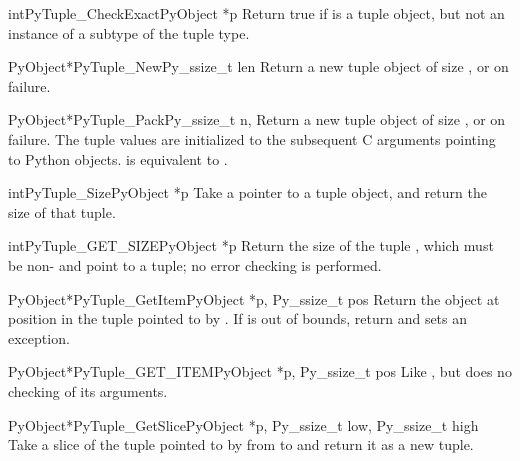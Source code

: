 \begin{cfuncdesc}{int}{PyTuple_CheckExact}{PyObject *p}
  Return true if  is a tuple object, but not an instance of a
  subtype of the tuple type.
\end{cfuncdesc}

\begin{cfuncdesc}{PyObject*}{PyTuple_New}{Py_ssize_t len}
  Return a new tuple object of size , or \NULL{} on failure.
\end{cfuncdesc}

\begin{cfuncdesc}{PyObject*}{PyTuple_Pack}{Py_ssize_t n, \moreargs}
  Return a new tuple object of size , or \NULL{} on failure.
  The tuple values are initialized to the subsequent  C arguments
  pointing to Python objects.  
  is equivalent to .
\end{cfuncdesc}

\begin{cfuncdesc}{int}{PyTuple_Size}{PyObject *p}
  Take a pointer to a tuple object, and return the size of that
  tuple.
\end{cfuncdesc}

\begin{cfuncdesc}{int}{PyTuple_GET_SIZE}{PyObject *p}
  Return the size of the tuple , which must be non-\NULL{} and
  point to a tuple; no error checking is performed.
\end{cfuncdesc}

\begin{cfuncdesc}{PyObject*}{PyTuple_GetItem}{PyObject *p, Py_ssize_t pos}
  Return the object at position  in the tuple pointed to by
  .  If  is out of bounds, return \NULL{} and sets an
   exception.
\end{cfuncdesc}

\begin{cfuncdesc}{PyObject*}{PyTuple_GET_ITEM}{PyObject *p, Py_ssize_t pos}
  Like , but does no checking of its
  arguments.
\end{cfuncdesc}

\begin{cfuncdesc}{PyObject*}{PyTuple_GetSlice}{PyObject *p,
                                               Py_ssize_t low, Py_ssize_t high}
  Take a slice of the tuple pointed to by  from  to
   and return it as a new tuple.
\end{cfuncdesc}

